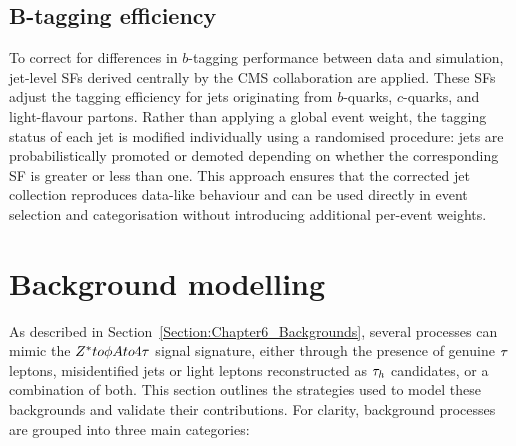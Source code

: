 \subsection{B-tagging efficiency}

To correct for differences in $b$-tagging performance between data and simulation, jet-level SFs derived centrally by the \ac{CMS} collaboration are applied. These SFs adjust the tagging efficiency for jets originating from $b$-quarks, $c$-quarks, and light-flavour partons. Rather than applying a global event weight, the tagging status of each jet is modified individually using a randomised procedure: jets are probabilistically promoted or demoted depending on whether the corresponding \ac{SF} is greater or less than one. This approach ensures that the corrected jet collection reproduces data-like behaviour and can be used directly in event selection and categorisation without introducing additional per-event weights.



\section{Background modelling}
\label{Section:Chapter6_Background_Modelling}

As described in Section~\ref{Section:Chapter6_Backgrounds}, several processes can mimic the $Z^* to \phi A to 4\tau$ signal signature, either through the presence of genuine $\tau$ leptons, misidentified jets or light leptons reconstructed as $\tau_h$ candidates, or a combination of both. This section outlines the strategies used to model these backgrounds and validate their contributions. For clarity, background processes are grouped into three main categories:



